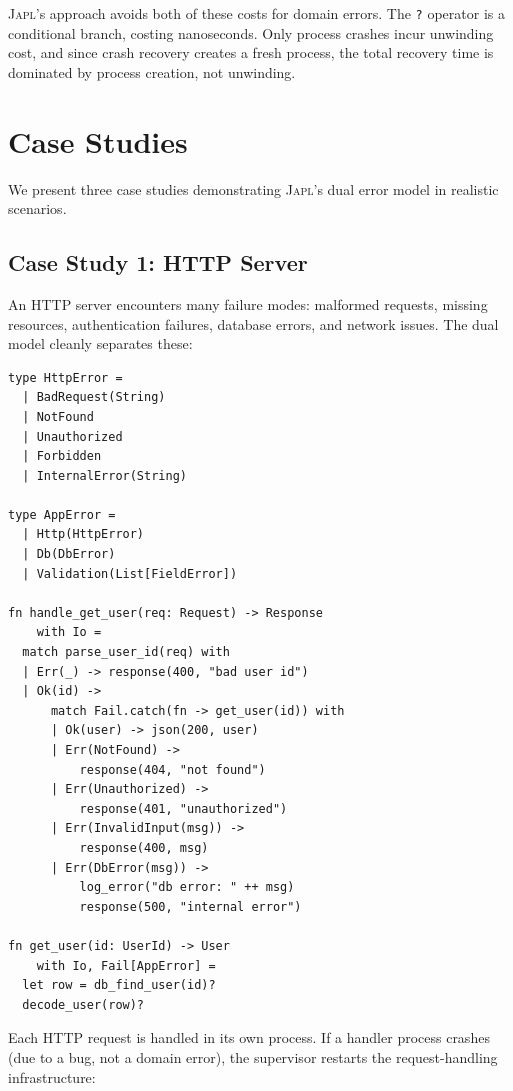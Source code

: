 \documentclass[11pt,twocolumn]{article}
\newcommand{\japl}{\textsc{Japl}}
\begin{document}
\japl{}'s approach avoids both of these costs for domain errors. The \texttt{?} operator is a conditional branch, costing nanoseconds. Only process crashes incur unwinding cost, and since crash recovery creates a fresh process, the total recovery time is dominated by process creation, not unwinding.

\section{Case Studies}\label{sec:case-studies}

We present three case studies demonstrating \japl{}'s dual error model in realistic scenarios.

\subsection{Case Study 1: HTTP Server}

An HTTP server encounters many failure modes: malformed requests, missing resources, authentication failures, database errors, and network issues. The dual model cleanly separates these:

\begin{lstlisting}
type HttpError =
  | BadRequest(String)
  | NotFound
  | Unauthorized
  | Forbidden
  | InternalError(String)

type AppError =
  | Http(HttpError)
  | Db(DbError)
  | Validation(List[FieldError])

fn handle_get_user(req: Request) -> Response
    with Io =
  match parse_user_id(req) with
  | Err(_) -> response(400, "bad user id")
  | Ok(id) ->
      match Fail.catch(fn -> get_user(id)) with
      | Ok(user) -> json(200, user)
      | Err(NotFound) ->
          response(404, "not found")
      | Err(Unauthorized) ->
          response(401, "unauthorized")
      | Err(InvalidInput(msg)) ->
          response(400, msg)
      | Err(DbError(msg)) ->
          log_error("db error: " ++ msg)
          response(500, "internal error")

fn get_user(id: UserId) -> User
    with Io, Fail[AppError] =
  let row = db_find_user(id)?
  decode_user(row)?
\end{lstlisting}

Each HTTP request is handled in its own process. If a handler process crashes (due to a bug, not a domain error), the supervisor restarts the request-handling infrastructure:
\end{document}
